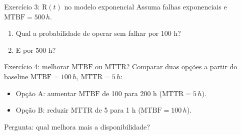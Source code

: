 \documentclass{beamer}
\newif\ifshowsolutions
\newcommand{\R}{\mathrm{R}}
\newcommand{\A}{\mathrm{A}}
\newcommand{\MTBF}{\mathrm{MTBF}}
\newcommand{\MTTR}{\mathrm{MTTR}}
\begin{document}
\ifshowsolutions
\begin{frame}{Gabarito Exercício 2}
\begin{itemize}
  \item \(\A=\frac{200}{200+4}=\frac{200}{204}\approx 0.98039\) (98.04\%)
  \item \(\text{downtime/ano}\approx (1-0.98039)\times8760\approx171.8\,h/ano\)
  \item Aproximadamente \textbf{7.2 dias/ano} indisponível.
\end{itemize}
\end{frame}
\fi

\begin{frame}{Exercício 3: \texorpdfstring{$\R(t)$}{R(t)} no modelo exponencial}
Assuma falhas exponenciais e \(\MTBF=500\,h\).
\begin{enumerate}
  \item Qual a probabilidade de operar sem falhar por 100 h?
  \item E por 500 h?
\end{enumerate}
\end{frame}

\ifshowsolutions
\begin{frame}{Gabarito Exercício 3}
\[
\R(t)=e^{-t/\MTBF}
\]
\begin{itemize}
  \item \(\R(100)=e^{-0.2}\approx 0.8187\)
  \item \(\R(500)=e^{-1}\approx 0.3679\)
\end{itemize}
\end{frame}
\fi

\begin{frame}{Exercício 4: melhorar \texorpdfstring{$\MTBF$}{MTBF} ou \texorpdfstring{$\MTTR$}{MTTR}?}
Comparar duas opções a partir do baseline \(\MTBF=100\,h\), \(\MTTR=5\,h\):
\begin{itemize}
  \item Opção A: aumentar \(\MTBF\) de 100 para 200 h (\(\MTTR=5\,h\)).
  \item Opção B: reduzir \(\MTTR\) de 5 para 1 h (\(\MTBF=100\,h\)).
\end{itemize}
Pergunta: qual melhora mais a disponibilidade?
\end{frame}

\ifshowsolutions
\begin{frame}{Gabarito Exercício 4}
\begin{itemize}
  \item \(\A_{old}=\frac{100}{100+5}=0.95238\)
  \item \(\A_A=\frac{200}{200+5}=0.97561\) (ganho de +2.323 p.p.)
  \item \(\A_B=\frac{100}{100+1}=0.99010\) (ganho de +3.772 p.p.)
\end{itemize}
\begin{block}{Conclusão}
Neste cenário, \textbf{reduzir MTTR} melhora mais a disponibilidade.
\end{block}
\end{frame}
\fi
\end{document}

